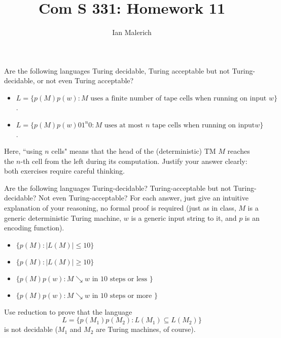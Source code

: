\documentclass[12pt]{jhwhw}
\author{Ian Malerich}
\title{Com S 331: Homework 11}
\begin{document}
\raggedright

\problem{}

	Are the following languages Turing decidable, Turing acceptable but not Turing-decidable,
	or not even Turing acceptable?

	\begin{itemize}
		\item $L=\{p(M)p(w): M 
			\text{ uses a finite number of tape cells when running on input }w\}$.
		\item $L=\{p(M)p(w)01^n0: M 
			\text{ uses at most $n$ tape cells when running on input}w\}$.
	\end{itemize}

	Here, ``using $n$ cells" means that the head of the (deterministic) TM $M$ reaches
	the $n$-th cell from the left during its computation. Justify your answer clearly:
	both exercises require careful thinking.

\solution

\problem{}

	Are the following languages Turing-decidable? Turing-acceptable but not Turing-decidable?
	Not even Turing-acceptable? For each answer, just give an intuitive explanation of
	your reasoning, no formal proof is required (just as in class, $M$ is a generic
	deterministic Turing machine, $w$ is a generic input string to it, and $p$ is an
	encoding function).

	\begin{itemize}
		\item $\{p(M) : |L(M)| \leq 10\}$
		\item $\{p(M) : |L(M)| \geq 10\}$
		\item $\{p(M)p(w) : M \searrow w \text{ in 10 steps or less }\}$
		\item $\{p(M)p(w) : M \searrow w \text{ in 10 steps or more }\}$
	\end{itemize}

\solution

\problem{}

	Use reduction to prove that the language 
	$$
		L = \{p(M_1)p(M_2): L(M_1) \subseteq L(M_2)\}
	$$
	is not decidable ($M_1$ and $M_2$ are Turing machines, of course).

\solution
\end{document}
